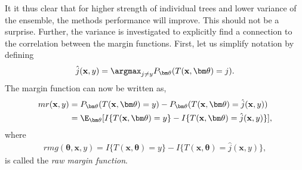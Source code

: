 It it thus clear that for higher strength of individual trees and lower variance of the ensemble, the methods performance will improve. This should not be a surprise. Further, the variance is investigated to explicitly find a connection to the correlation between the margin functions.  
First, let us simplify notation by defining
\begin{align}
  \hat j(\mathbf{x}, y) = \argmax_{j \neq y} P_{\bm \theta}(T(\mathbf{x}, \bm \theta) = j).
\end{align}
The margin function can now be written as,
\begin{align}
  mr(\mathbf{x},y) 
  &= P_{\bm \theta}(T(\mathbf{x},\bm \theta) = y) - P_{\bm \theta} (T(\mathbf{x}, \bm \theta) = \hat j (\mathbf{x}, y)) \notag \\
  &= \E_{\bm \theta}[I\{T(\mathbf{x},\bm \theta) = y\} - I\{T(\mathbf{x}, \bm \theta) = \hat j (\mathbf{x}, y)\}],
\end{align}
where
\begin{align}
  rmg(\bm \theta, \mathbf{x}, y) = I\{T(\mathbf{x},\bm \theta) = y\} - I\{T(\mathbf{x}, \bm \theta) = \hat j (\mathbf{x}, y)\},
\end{align}
is called the \textit{raw margin function}.

